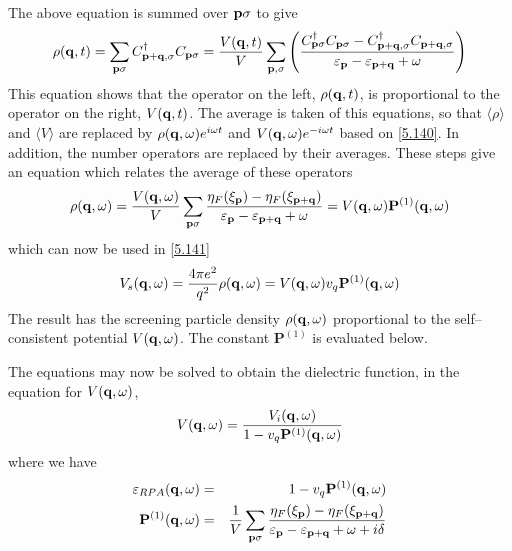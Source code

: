 The above equation is summed over $\mathbf{p}\sigma$ to give
\begin{equation}
    \rho(\mathbf{q},t) = \sum_{\mathbf{p}\sigma} C^\dagger_{\mathbf{p}+\mathbf{q},\sigma} C_{\mathbf{p}\sigma} = \frac{V(\mathbf{q},t)}{V} \sum_{\mathbf{p},\sigma}\left( \frac{C^\dagger_{\mathbf{p}\sigma}C_{\mathbf{p}\sigma} - C^\dagger_{\mathbf{p}+\mathbf{q},\sigma} C_{\mathbf{p}+\mathbf{q},\sigma}}{\varepsilon_{\mathbf{p}} -\varepsilon_{\mathbf{p}+\mathbf{q}} +\omega}   \right)
\end{equation}
This equation shows that the operator on the left, $\rho(\mathbf{q},t)$, is proportional to the operator on the right, $V(\mathbf{q},t)$.
The average is taken of this equations, so that $\langle \rho \rangle $ and $\langle V \rangle$ are replaced by $\rho(\mathbf{q},\omega) e^{i\omega t}$ and $V(\mathbf{q},\omega) e^{-i\omega t}$ based on \eqref{5.140}.
In addition, the number operators are replaced by their averages.
These steps give an equation which relates the average of these operators
\begin{equation}
    \rho(\mathbf{q},\omega) = \frac{V(\mathbf{q},\omega)}{V} \sum_{\mathbf{p}\sigma} \frac{\eta_F(\xi_{\mathbf{p}}) -\eta_F(\xi_{\mathbf{p}+\mathbf{q}})}{\varepsilon_{\mathbf{p}} -\varepsilon_{\mathbf{p}+\mathbf{q}}+ \omega} = V(\mathbf{q},\omega) \mathbf{P}^{(1)}(\mathbf{q},\omega)  \label{5.148}
\end{equation}
which can now be used in \eqref{5.141}
\begin{equation}
    V_s(\mathbf{q},\omega) = \frac{4\pi e^2}{q^2} \rho(\mathbf{q},\omega) = V(\mathbf{q},\omega) v_q \mathbf{P}^{(1)}(\mathbf{q},\omega)    \label{5.149}
\end{equation}
The result has the screening particle density $\rho(\mathbf{q},\omega)$ proportional to the self--consistent potential $V(\mathbf{q},\omega)$.
The constant $\mathbf{P}^{(1)}$ is evaluated below.

The equations may now be solved to obtain the dielectric function, in the equation for $V(\mathbf{q},\omega)$,
\begin{equation}
    V(\mathbf{q},\omega) = \frac{V_i(\mathbf{q},\omega)}{1- v_q \mathbf{P}^{(1)}(\mathbf{q},\omega)} \label{5.150}
\end{equation}
where we have
\begin{eqnarray}
    \varepsilon_{RPA}(\mathbf{q},\omega) & = & 1 -v_q \mathbf{P}^{(1)}(\mathbf{q},\omega) \label{5.151} \\
    \mathbf{P}^{(1)}(\mathbf{q},\omega) & = & \frac{1}{V} \sum_{\mathbf{p}\sigma} \frac{\eta_F(\xi_{\mathbf{p}})-\eta_F(\xi_{\mathbf{p}+\mathbf{q}})}{\varepsilon_{\mathbf{p}}- \varepsilon_{\mathbf{p}+\mathbf{q}} + \omega + i\delta}    \label{5.152}
\end{eqnarray}

